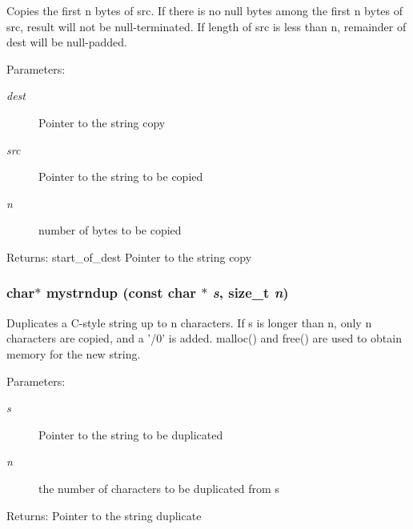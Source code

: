 Copies the first n bytes of src. If there is no null bytes among the first n bytes of src, result will not be null-terminated. If length of src is less than n, remainder of dest will be null-padded. \begin{Desc}
\item[Parameters:]
\begin{description}
\item[{\em dest}]Pointer to the string copy \item[{\em src}]Pointer to the string to be copied \item[{\em n}]number of bytes to be copied \end{description}
\end{Desc}
\begin{Desc}
\item[Returns:]start\_\-of\_\-dest Pointer to the string copy \end{Desc}
\subsubsection{\setlength{\rightskip}{0pt plus 5cm}char$\ast$ mystrndup (const char $\ast$ {\em s}, size\_\-t {\em n})}\label{mystring_8h_9dc11eca5ee6b0e312610650bbe36e6d}


Duplicates a C-style string up to n characters. If s is longer than n, only n characters are copied, and a '/0' is added. malloc() and free() are used to obtain memory for the new string. \begin{Desc}
\item[Parameters:]
\begin{description}
\item[{\em s}]Pointer to the string to be duplicated \item[{\em n}]the number of characters to be duplicated from s \end{description}
\end{Desc}
\begin{Desc}
\item[Returns:]Pointer to the string duplicate \end{Desc}
